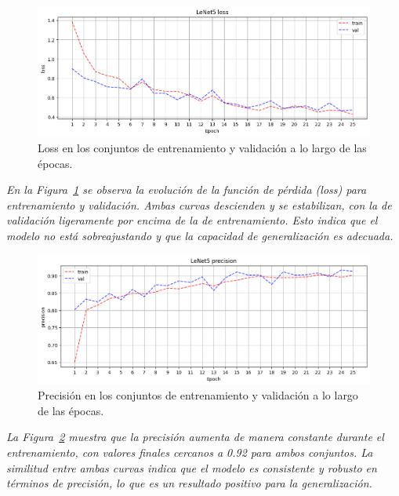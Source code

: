 \documentclass[conference]{IEEEtran}
\begin{document}
\begin{figure}[H]
    \centering
    \includegraphics[width=0.95\linewidth]{graphics-bilateral/bilateral-loss-train_val.png}
    \caption{Loss en los conjuntos de entrenamiento y validación a lo largo de las épocas.}
    \label{fig:bilateral-loss-train_val}
\end{figure}
\noindent\textit{
En la Figura~\ref{fig:bilateral-loss-train_val} se observa la evolución de la función de pérdida (loss) para entrenamiento y validación. Ambas curvas descienden y se estabilizan, con la de validación ligeramente por encima de la de entrenamiento. Esto indica que el modelo no está sobreajustando y que la capacidad de generalización es adecuada.
}

\begin{figure}[H]
    \centering
    \includegraphics[width=0.95\linewidth]{graphics-bilateral/bilateral-precision-train_val.png}
    \caption{Precisión en los conjuntos de entrenamiento y validación a lo largo de las épocas.}
    \label{fig:bilateral-precision-train_val}
\end{figure}
\noindent\textit{
La Figura~\ref{fig:bilateral-precision-train_val} muestra que la precisión aumenta de manera constante durante el entrenamiento, con valores finales cercanos a 0.92 para ambos conjuntos. La similitud entre ambas curvas indica que el modelo es consistente y robusto en términos de precisión, lo que es un resultado positivo para la generalización.
}
\end{document}
